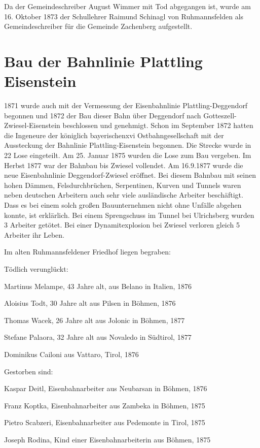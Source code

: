 \documentclass[12pt,a4pager]{book}
\begin{document}
Da der Gemeindeschreiber August Wimmer mit Tod abgegangen ist, wurde am 16.
Oktober 1873 der Schullehrer Raimund Schinagl von Ruhmannsfelden als
Gemeindeschreiber für die Gemeinde Zachenberg aufgestellt.

\section{Bau der Bahnlinie Plattling Eisenstein}

1871 wurde auch mit der Vermessung der Eisenbahnlinie Plattling-Deggendorf
begonnen und 1872 der Bau dieser Bahn über Deggendorf nach
Gotteszell-Zwiesel-Eisenstein beschlossen und genehmigt. Schon im September 1872
hatten die Ingeneure der königlich bayerischenxvi Ostbahngesellschaft mit der
Aussteckung der Bahnlinie Plattling-Eisenstein begonnen. Die Strecke wurde in 22
Lose eingeteilt. Am 25. Januar 1875 wurden die Lose zum Bau vergeben. Im Herbst
1877 war der Bahnbau bis Zwiesel vollendet. Am 16.9.1877 wurde die neue
Eisenbahnlinie Deggendorf-Zwiesel eröffnet. Bei diesem Bahnbau mit seinen hohen
Dämmen, Felsdurchbrüchen, Serpentinen, Kurven und Tunnels waren neben deutschen
Arbeitern auch sehr viele ausländische Arbeiter beschäftigt. Dass es bei einem
solch großen Bauunternehmen nicht ohne Unfälle abgehen konnte, ist erklärlich.
Bei einem Sprengschuss im Tunnel bei Ulrichsberg wurden 3 Arbeiter getötet. Bei
einer Dynamitexplosion bei Zwiesel verloren gleich 5 Arbeiter ihr Leben.

Im alten Ruhmannsfeldener Friedhof liegen begraben:

Tödlich verunglückt:

Martinus Melampe, 43 Jahre alt, aus Belano in Italien, 1876

Aloisius Todt, 30 Jahre alt aus Pilsen in Böhmen, 1876

Thomas Wacek, 26 Jahre alt aus Jolonic in Böhmen, 1877

Stefane Palaora, 32 Jahre alt aus Novaledo in Südtirol, 1877

Dominikus Cailoni aus Vattaro, Tirol, 1876

Gestorben sind:

Kaspar Deitl, Eisenbahnarbeiter aus Neubarsan in Böhmen, 1876

Franz Koptka, Eisenbahnarbeiter aus Zambeka in Böhmen, 1875

Pietro Scabzeri, Eisenbahnarbeiter aus Pedemonte in Tirol, 1875

Joseph Rodina, Kind einer Eisenbahnarbeiterin aus Böhmen, 1875
\end{document}
